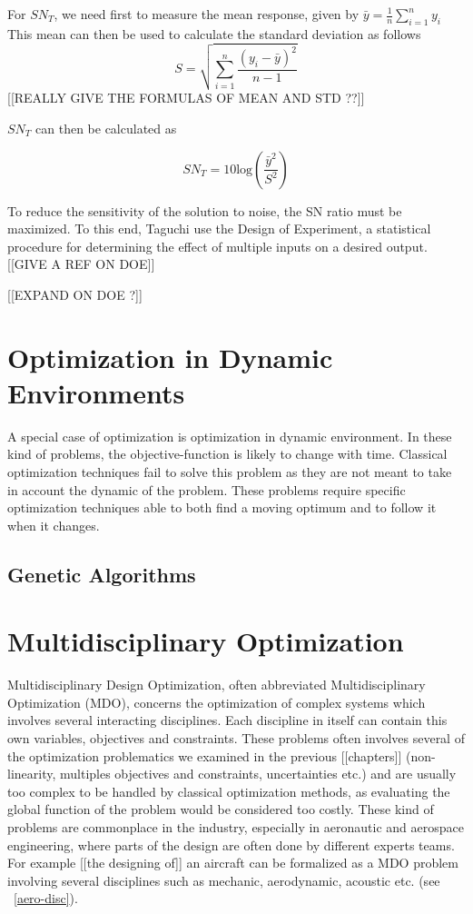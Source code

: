 For $SN_T$, we need first to measure the mean response, given by $\bar{y} = \frac{1}{n}\sum_{i=1}^n y_i$
This mean can then be used to calculate the standard deviation as follows 
\[S = \sqrt{\sum_{i=1}^n \frac{(y_i - \bar{y})^2}{n-1}}\]
[[REALLY GIVE THE FORMULAS OF MEAN AND STD ??]]

 $SN_T$ can then be calculated as
 
 \[ SN_T = 10\text{log}\left(\frac{\bar{y}^2}{S^2}\right) \]
 
To reduce the sensitivity of the solution to noise, the SN ratio must be maximized. To this end, Taguchi use the Design of Experiment, a statistical procedure for determining the effect of multiple inputs on a desired output. [[GIVE A REF ON DOE]]

[[EXPAND ON DOE  ?]]

\subsection{}

\chapter{Optimization in Dynamic Environments}
A special case of optimization is optimization in dynamic environment. In these kind of problems, the objective-function is likely to change with time.
Classical optimization techniques fail to solve this problem as they are not meant to take in account the dynamic of the problem.
These problems require specific optimization techniques able to both find a moving optimum and to follow it when it changes.

\section{Genetic Algorithms}

\chapter{Multidisciplinary Optimization}

Multidisciplinary Design Optimization, often abbreviated Multidisciplinary Optimization (MDO), concerns the optimization of complex systems which involves several interacting disciplines. Each discipline in itself can contain this own variables, objectives and constraints. These problems often involves several of the optimization problematics we examined in the previous [[chapters]] (non-linearity, multiples objectives and constraints, uncertainties etc.) and are usually too complex to be handled by classical optimization methods, as evaluating the global function of the problem would be considered too costly.
These kind of problems are commonplace in the industry, especially in aeronautic and aerospace engineering, where parts of the design are often done by different experts teams. For example [[the designing of]] an aircraft can be formalized as a MDO problem involving several disciplines such as mechanic, aerodynamic, acoustic etc. (see \figurename\ \ref{aero-disc}).

